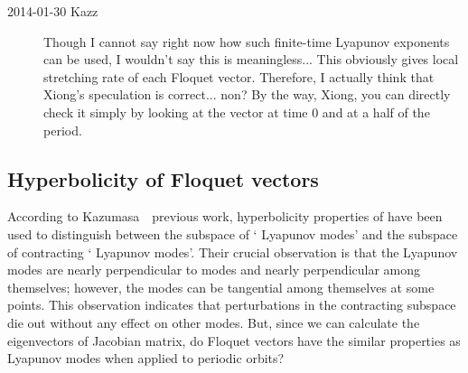 \begin{description}
\item[2014-01-30 Kazz] Though I cannot say right now how such finite-time Lyapunov exponents can be used, I wouldn't say this is meaningless... This obviously gives local stretching rate of each Floquet vector. Therefore, I actually think that Xiong's speculation is correct... non? By the way, Xiong, you can directly check it simply by looking at the vector at time 0 and at a half of the period.


\end{description}

\subsection{Hyperbolicity of Floquet vectors}

According to Kazumasa~\etal\ previous work, hyperbolicity properties of
{\cLvs} have been used to
distinguish between the subspace of `{\entangled} Lyapunov modes' and
the subspace of contracting `{\transient} Lyapunov modes'. Their crucial observation
is that the {\transient} Lyapunov modes are nearly perpendicular to {\entangled} modes
and nearly perpendicular among themselves; however, the {\entangled} modes can be
tangential among themselves at some points. This observation indicates that
perturbations in the contracting {\transient} subspace  die out
 without any effect on
other modes.
But, since we can calculate the eigenvectors of Jacobian matrix, do Floquet
vectors have the similar properties as Lyapunov modes%
when applied to periodic orbits?


